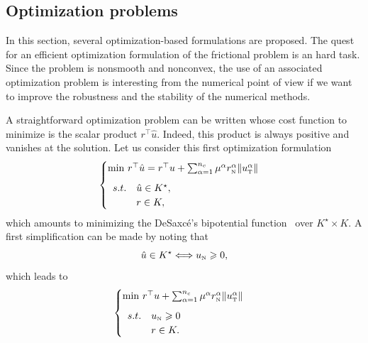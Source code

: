 \subsection{Optimization problems}

In this section, several optimization-based formulations are proposed. The quest for an efficient optimization formulation of the frictional problem is an hard task. Since the problem is nonsmooth and nonconvex, the use of an associated optimization problem is interesting from the numerical point of view if we want to improve the robustness and the stability of the numerical methods.


 A straightforward optimization problem can be written whose cost function to minimize is the scalar product $r^\top\hat u$. Indeed, this product is always  positive and vanishes at the solution. Let us consider this first optimization formulation
\begin{equation}
  \label{eq:opt-1}
  \begin{cases}
    \min\,  r^\top \hat u = r^\top u + \sum _{\alpha=1}^{n_c} \mu^\alpha r_\n^\alpha \|u_\t^\alpha\| \\[2mm]
    \begin{array}{ll}
    s.t. &\hat u \in K^\star, \\
    &r \in K,
  \end{array}
  \end{cases}
\end{equation}
which amounts to minimizing the DeSaxc\'e's bipotential function~\cite{DeSaxce92} over $K^\star\times K$. A first simplification can be made by noting that
\begin{equation}
  \label{eq:equiv-cone}
  \hat u \in K^\star \Longleftrightarrow u_{\n} \geq 0, 
\end{equation}
which leads to
\begin{equation}
  \label{eq:opt-2}
  \begin{cases}
    \min\, r^\top u + \sum _{\alpha=1}^{n_c} \mu^\alpha r_\n^\alpha \|u_\t^\alpha\| \\[2mm]
     \begin{array}{ll}
    s.t. &u_\n \geq 0\\
    &r \in K.
  \end{array}
  \end{cases}
\end{equation}


